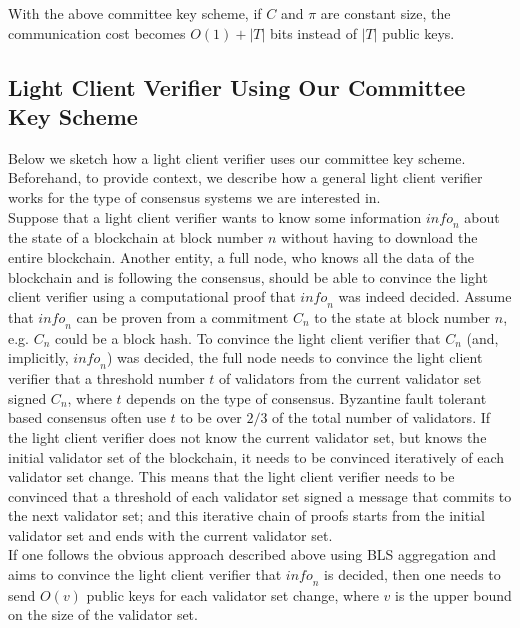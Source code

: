 \noindent With the above committee key scheme, if $C$ and $\pi$ are constant size, 
the communication cost becomes $O(1)+|T|$ bits instead of $|T|$ public keys.

\subsection{Light Client Verifier Using Our Committee Key Scheme}

\noindent Below we sketch how a light client verifier uses our committee key scheme. Beforehand, to provide context, 
we describe how a general light client verifier works for the type of consensus systems we are interested in. \\

\noindent Suppose that a light client verifier wants to know some information $\mathit{info}_n$ 
about the state of a blockchain at block number $n$ without having to download the entire blockchain. 
Another entity, a full node, who knows all the data of the blockchain and is following the consensus, should be able to convince 
the light client verifier using a computational proof that $\mathit{info}_n$ was indeed decided. Assume that $\mathit{info}_n$ 
can be proven from a commitment $C_n$ to the state at block number $n$, e.g. $C_n$ could be a block hash. 
To convince the light client verifier that $C_n$ (and, implicitly, $\mathit{info}_n$) was decided, 
the full node needs to convince the light client verifier that a threshold number $t$ of 
validators from the current validator set signed $C_n$, where $t$ depends on the type of consensus. 
Byzantine fault tolerant based consensus often use $t$ to be over $2/3$ of the total number of validators. 
If the light client verifier does not know the current validator set, but knows the initial validator set of the blockchain, 
it needs to be convinced iteratively of each validator set change. This means that the light client verifier needs to be convinced 
that a threshold of each validator set signed a message that commits to the next validator set; and this iterative chain of proofs starts 
from the initial validator set and ends with the current validator set. \\

\noindent If one follows the obvious approach described above using BLS aggregation and aims to convince the light client verifier 
that $\mathit{info}_n$ is decided, then one needs to send $O(v)$ public keys for each validator set change, where $v$ is the upper bound 
on the size of the validator set. \\

